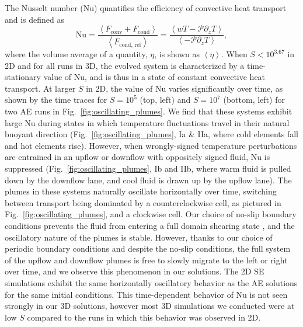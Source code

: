 \documentclass[aps, pre, onecolumn, nofootinbib, notitlepage, groupedaddress, amsfonts, amssymb, amsmath, longbibliography]{revtex4-1}
\newcommand{\angles}[1]{\ensuremath{\left\langle #1 \right\rangle}}
\begin{document}
The Nusselt number (Nu) quantifies the efficiency of convective heat transport
and is defined as
\begin{equation}
\text{Nu} = \frac{\angles{F_{\text{conv}} + F_{\text{cond}}}}{\angles{F_{\text{cond, ref}}}}
 = \frac{\angles{wT - \mathcal{P}\partial_z T}}{\angles{- \mathcal{P} \partial_z T}},
\end{equation}
where the volume average of a quantity, $\eta$, is shown as $\angles{\eta}$.
When $S < 10^{3.67}$ in 2D and for all runs in 3D, 
the evolved system is characterized by a time-stationary value of Nu, and is thus
in a state of constant convective heat transport.
At larger $S$ in 2D, the value of Nu varies significantly over time,
as shown by the time traces for $S = 10^5$ (top, left) and $S = 10^7$ (bottom, left) for two
AE runs in Fig.~\ref{fig:oscillating_plumes}. We find that these systems exhibit
large Nu during
states in which temperature fluctuations travel in their natural buoyant
direction (Fig.~\ref{fig:oscillating_plumes}, Ia \& IIa, where cold elements fall and hot elements rise).
However, when wrongly-signed temperature perturbations are entrained in an upflow or downflow
with oppositely signed fluid, Nu is suppressed (Fig.~\ref{fig:oscillating_plumes}, Ib and IIb, 
where warm fluid is pulled down by the downflow
lane, and cool fluid is drawn up by the upflow lane). The plumes in these
systems naturally oscillate horizontally over time, switching between transport being dominated
by a counterclockwise cell, as pictured in Fig.~\ref{fig:oscillating_plumes}, and
a clockwise cell. Our choice of no-slip
boundary conditions prevents the fluid from entering a full domain shearing state 
\cite{goluskin&all2014}, and the
oscillatory nature of the plumes is stable. However, thanks to our choice of periodic
boundary conditions and despite the no-slip conditions, the full system of the
upflow and downflow plumes is free to slowly migrate to the left or right over time,
and we observe this phenomenon in our solutions.
The 2D SE simulations exhibit the same horizontally
oscillatory behavior as the AE solutions for the same initial conditions. 
This time-dependent behavior of Nu is not seen strongly in our 3D solutions,
however most 3D simulations we conducted were at low $S$ compared to the runs in
which this behavior was observed in 2D.
\end{document}
